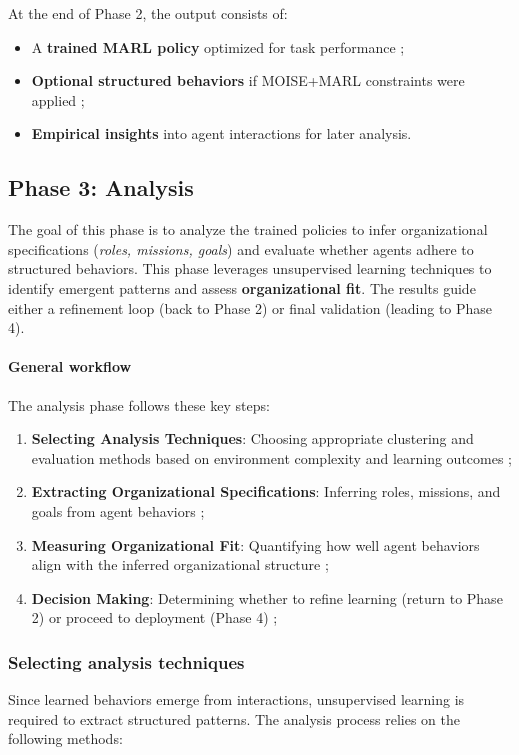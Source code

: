 \documentclass[journal]{IEEEtai}
\begin{document}
At the end of Phase 2, the output consists of:
\begin{itemize}
    \item A \textbf{trained MARL policy} optimized for task performance ;
    \item \textbf{Optional structured behaviors} if MOISE+MARL constraints were applied ;
    \item \textbf{Empirical insights} into agent interactions for later analysis.
\end{itemize}

\subsection{Phase 3: Analysis}

The goal of this phase is to analyze the trained policies to infer organizational specifications (\textit{roles, missions, goals}) and evaluate whether agents adhere to structured behaviors. This phase leverages unsupervised learning techniques to identify emergent patterns and assess \textbf{organizational fit}. The results guide either a refinement loop (back to Phase 2) or final validation (leading to Phase 4).

\paragraph{\textbf{General workflow}} 
The analysis phase follows these key steps:
\begin{enumerate}
    \item \textbf{Selecting Analysis Techniques}: Choosing appropriate clustering and evaluation methods based on environment complexity and learning outcomes ;
    \item \textbf{Extracting Organizational Specifications}: Inferring roles, missions, and goals from agent behaviors ;
    \item \textbf{Measuring Organizational Fit}: Quantifying how well agent behaviors align with the inferred organizational structure ;
    \item \textbf{Decision Making}: Determining whether to refine learning (return to Phase 2) or proceed to deployment (Phase 4) ;
\end{enumerate}

\subsubsection{Selecting analysis techniques}
Since learned behaviors emerge from interactions, unsupervised learning is required to extract structured patterns. The analysis process relies on the following methods:
\end{document}
